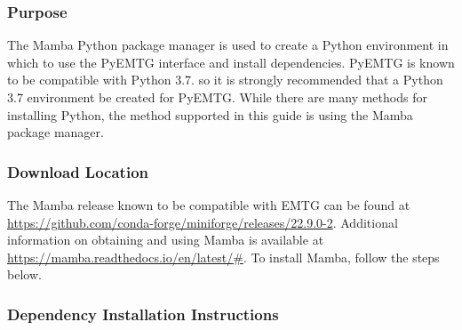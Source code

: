 
\subsubsection{Purpose}

The Mamba Python package manager is used to create a Python environment in which to use the PyEMTG interface and install dependencies. PyEMTG is known to be compatible with Python 3.7. so it is strongly recommended that a Python 3.7 environment be created for PyEMTG. While there are many methods for installing Python, the method supported in this guide is using the Mamba package manager. 

\subsubsection{Download Location}

The Mamba release known to be compatible with \ac{EMTG} can be found at \url{https://github.com/conda-forge/miniforge/releases/22.9.0-2}. Additional information on obtaining and using Mamba is available at \url{https://mamba.readthedocs.io/en/latest/\#}. To install Mamba, follow the steps below.

\subsubsection{Dependency Installation Instructions}

